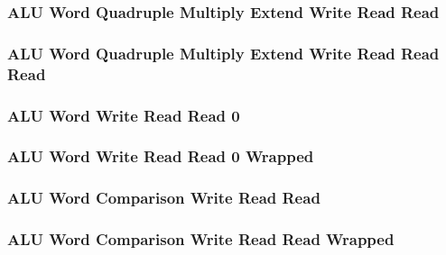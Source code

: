\subsubsection[{\small ALU Word Quadruple Multiply Extend Write Read Read}]{ALU Word Quadruple Multiply Extend Write Read Read} \label{sec:format-ALU-QMEWRR}



\subsubsection[{\small ALU Word Quadruple Multiply Extend Write Read Read Read}]{ALU Word Quadruple Multiply Extend Write Read Read Read} \label{sec:format-ALU-QMEWRRR}



\subsubsection[{\small ALU Word Write Read Read 0}]{ALU Word Write Read Read 0} \label{sec:format-ALU-WWRR0}



\subsubsection[{\small ALU Word Write Read Read 0 Wrapped}]{ALU Word Write Read Read 0 Wrapped} \label{sec:format-ALU-WWRR0.W}



\subsubsection[{\small ALU Word Comparison Write Read Read}]{ALU Word Comparison Write Read Read} \label{sec:format-ALU-WCWRR}



\subsubsection[{\small ALU Word Comparison Write Read Read Wrapped}]{ALU Word Comparison Write Read Read Wrapped} \label{sec:format-ALU-WCWRR.W}

